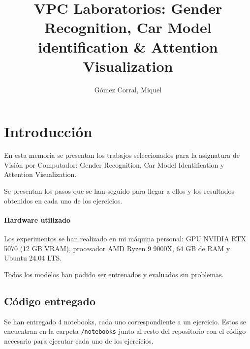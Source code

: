 \documentclass[11pt,spanish,listoffigures,listoftables]{tfgetsinf}
\title{VPC Laboratorios: Gender Recognition, Car Model identification \& Attention Visualization}
\author{Gómez Corral, Miquel}
\begin{document}







\mainmatter

\chapter{Introducción}
En esta memoria se presentan los trabajos seleccionados para la asignatura de Visión por Computador: Gender Recognition, Car Model Identification y Attention Visualization.

Se presentan los pasos que se han seguido para llegar a ellos y los resultados obtenidos en cada uno de los ejercicios.

\subsubsection{Hardware utilizado}
Los experimentos se han realizado en mi máquina personal: GPU NVIDIA RTX 5070 (12 GB VRAM), procesador AMD Ryzen 9 9000X, 64 GB de RAM y Ubuntu 24.04 LTS.

Todos los modelos han podido ser entrenados y evaluados sin problemas. 

\section{Código entregado}
Se han entregado 4 notebooks, cada uno correspondiente a un ejercicio.   Estos se encuentran en la carpeta \texttt{/notebooks} junto al resto del repositorio con el código necesario para ejecutar cada uno de los ejercicios.
\end{document}
